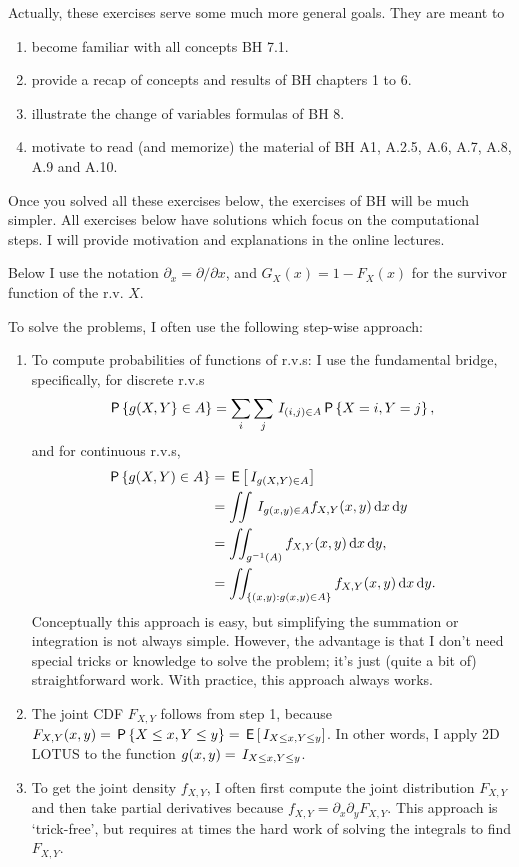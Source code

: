 \documentclass[a4paper,11pt]{article}
\begin{document}
Actually, these exercises serve some much more general goals. They are meant to
\begin{enumerate}
\item become familiar with all concepts  BH 7.1.
\item  provide a recap of concepts and results of  BH chapters 1 to 6.
\item illustrate the change of variables formulas of BH 8.
\item  motivate to read (and memorize) the material of BH A1, A.2.5, A.6, A.7, A.8, A.9 and A.10.
\end{enumerate}
Once you solved all these exercises below, the exercises of BH will be much simpler.
All exercises below have solutions which focus on the computational steps. I will provide motivation and  explanations in the online lectures.

Below I use the notation $\partial_x = \partial / \partial x$, and $G_{X}(x)=1-F_{X}(x)$ for the survivor function of the r.v. $X$.

To solve the problems, I often  use the following step-wise approach:
\begin{enumerate}
\item To compute probabilities of functions of r.v.s: I use the fundamental bridge, specifically, for discrete r.v.s
  \begin{equation}
    \label{eq:60}
\,\mathsf{P}\left\{g(X,Y\right\}\in A\} = \sum_{i}\sum_j \,I_{(i, j)\in A} \,\mathsf{P}\left\{X=i, Y=j\right\}, 
  \end{equation}
and for continuous r.v.s, 
  \begin{equation}
    \label{eq:55}
    \begin{split}
\,\mathsf{P}\left\{g(X, Y) \in A\right\} 
&= \,\mathsf{E}\left[\,I_{g(X,Y)\in A}\right] \\
&= \iint \,I_{g(x,y) \in A} f_{X,Y}(x,y) \,\textrm{d}x \,\textrm{d}y \\
&= \iint_{g^{-1}(A)} f_{X,Y}(x, y) \,\textrm{d}x \,\textrm{d}y,\\
&= \iint_{\{(x,y): g(x,y) \in A\}} f_{X,Y}(x,y) \,\textrm{d}x \,\textrm{d}y.
    \end{split}
  \end{equation}
Conceptually this approach is easy, but simplifying  the summation or integration is not always simple.
However, the advantage is that I don't need special tricks or knowledge to solve the problem; it's just (quite a bit of) straightforward work.
With practice, this approach always works.
\item The joint CDF $F_{X,Y}$ follows from step 1, because $F_{X,Y}(x,y) = \,\mathsf{P}\left\{X\leq x, Y\leq y\right\} = \,\mathsf{E}\left[\,I_{X\leq x, Y\leq y}\right]$.
  In other words, I apply 2D LOTUS to the function $g(x,y) = \,I_{X\leq x, Y\leq y}$.
\item To get the joint density $f_{X,Y}$, I often first compute the joint distribution $F_{X,Y}$ and then take partial derivatives because $f_{X,Y} = \partial_{x}\partial_y F_{X,Y}$.
  This approach is `trick-free', but requires at times the hard work of solving the integrals to find $F_{X,Y}$.
\end{enumerate}
\end{document}
